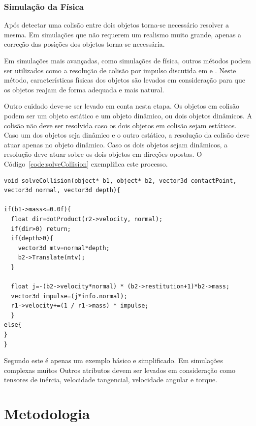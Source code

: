 \subsubsection{Simulação da Física}

Após detectar uma colisão entre dois objetos torna-se necessário resolver
a mesma. Em simulações que não requerem um realismo muito grande, apenas a
correção das posições dos objetos torna-se necessária.

Em simulações mais avançadas, como simulações de física, outros métodos podem
ser utilizados como a resolução de colisão por impulso discutida em  e .
Neste método, características físicas dos objetos são levados em consideração
para que os objetos reajam de forma adequada e mais natural.

Outro cuidado deve-se ser levado em conta nesta etapa.
Os objetos em colisão podem ser um objeto estático e um objeto dinâmico, ou
dois objetos dinâmicos. A colisão não deve ser resolvida caso os dois objetos
em colisão sejam estáticos.
Caso um dos objetos seja dinâmico e o outro estático, a resolução da colisão
deve atuar apenas no objeto dinâmico.
Caso os dois objetos sejam dinâmicos, a resolução deve atuar sobre os dois
objetos em direções opostas. O Código~\ref{code:solveCollision} exemplifica este processo.

\begin{lstlisting}[frame=single,caption=Exemplo de resolução de colisão\label{code:solveCollision}]
void solveCollision(object* b1, object* b2, vector3d contactPoint, vector3d normal, vector3d depth){

if(b1->mass<=0.0f){
  float dir=dotProduct(r2->velocity, normal);
  if(dir>0) return;
  if(depth>0){
    vector3d mtv=normal*depth;
    b2->Translate(mtv);
  }

  float j=-(b2->velocity*normal) * (b2->restitution+1)*b2->mass;
  vector3d impulse=(j*info.normal);
  r1->velocity+=(1 / r1->mass) * impulse;
  }
else{
}
}
\end{lstlisting}

Segundo  este é apenas um exemplo básico e simplificado. Em simulações complexas muitos Outros atributos devem ser levados em consideração como tensores de inércia, velocidade tangencial, velocidade angular e torque.

\section{Metodologia}

